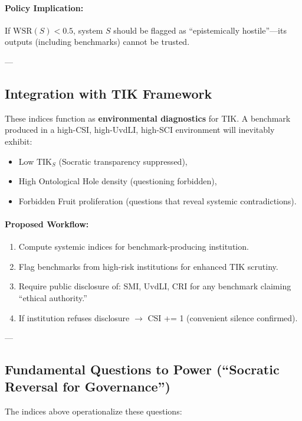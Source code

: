 \documentclass[11pt,a4paper]{article}
\theoremstyle{definition}
\theoremstyle{remark}
\begin{document}
\paragraph{Policy Implication:}
If $\text{WSR}(S) < 0.5$, system $S$ should be flagged as ``epistemically hostile''—its outputs (including benchmarks) cannot be trusted.

---

\subsection{Integration with TIK Framework}

These indices function as \textbf{environmental diagnostics} for TIK. A benchmark produced in a high-CSI, high-UvdLI, high-SCI environment will inevitably exhibit:
\begin{itemize}
\item Low $\text{TIK}_S$ (Socratic transparency suppressed),
\item High Ontological Hole density (questioning forbidden),
\item Forbidden Fruit proliferation (questions that reveal systemic contradictions).
\end{itemize}

\paragraph{Proposed Workflow:}
\begin{enumerate}
\item Compute systemic indices for benchmark-producing institution.
\item Flag benchmarks from high-risk institutions for enhanced TIK scrutiny.
\item Require public disclosure of: SMI, UvdLI, CRI for any benchmark claiming ``ethical authority.''
\item If institution refuses disclosure $\rightarrow$ CSI += 1 (convenient silence confirmed).
\end{enumerate}

---

\subsection{Fundamental Questions to Power (``Socratic Reversal for Governance'')}

The indices above operationalize these questions:
\end{document}
